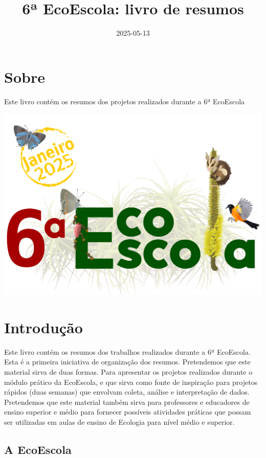 \documentclass[
]{book}
\title{6ª EcoEscola: livro de resumos}
\author{}
\date{\vspace{-2.5em}2025-05-13}
\begin{document}
\maketitle

{
\setcounter{tocdepth}{1}
\tableofcontents
}
\chapter{Sobre}\label{sobre}

Este livro contém os resumos dos projetos realizados durante a 6ª EcoEscola

\includegraphics[width=57.42in]{figs/ecoescolalogo}

\chapter{Introdução}\label{introduuxe7uxe3o}

Este livro contém os resumos dos trabalhos realizados durante a 6ª EcoEscola.
Esta é a primeira iniciativa de organização dos resumos. Pretendemos que este
material sirva de duas formas. Para apresentar os projetos realizados durante
o módulo prático da EcoEscola, e que sirva como fonte de inspiração para projetos
rápidos (duas semanas) que envolvam coleta, análise e interpretação de dados.
Pretendemos que este material também sirva para professores e educadores de
ensino superior e médio para fornecer possíveis atividades práticas que possam
ser utilizadas em aulas de ensino de Ecologia para nível médio e superior.

\section{A EcoEscola}\label{a-ecoescola}
\end{document}
